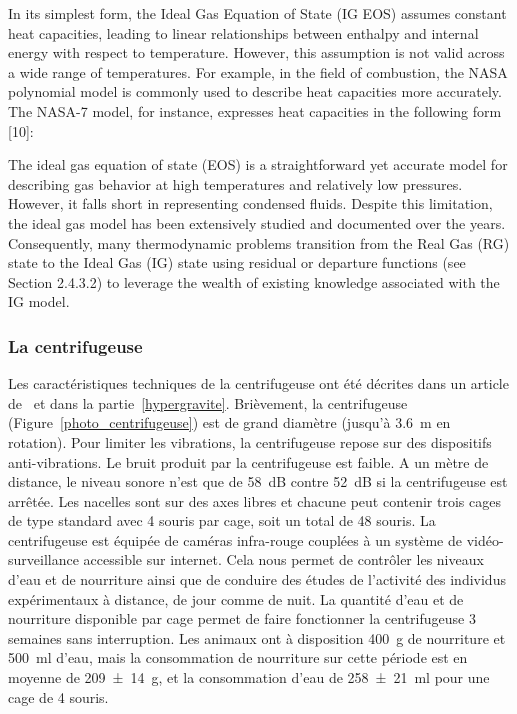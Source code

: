 	In its simplest form, the Ideal Gas Equation of State (IG EOS) assumes constant heat capacities, leading to linear relationships between enthalpy and internal energy 
	with respect to temperature. However, this assumption is not valid across a wide range of temperatures. For example, in the field of combustion, the NASA polynomial 
	model is commonly used to describe heat capacities more accurately. The NASA-7 model, for instance, expresses heat capacities in the following form [10]:


	The ideal gas equation of state (EOS) is a straightforward yet accurate model for describing gas behavior at high temperatures and relatively low pressures. 
	However, it falls short in representing condensed fluids. Despite this limitation, the ideal gas model has been extensively studied and documented over the years. 
	Consequently, many thermodynamic problems transition from the Real Gas (RG) state to the Ideal Gas (IG) state using residual or departure functions (see Section 2.4.3.2)
	to leverage the wealth of existing knowledge associated with the IG model.
	
		\subsubsection{La centrifugeuse}

			Les caractéristiques techniques de la centrifugeuse ont été décrites dans un article de~\cite{jamon_ground-based_2008} et dans la partie~\ref{hypergravite}. Brièvement, la centrifugeuse (Figure~\ref{photo_centrifugeuse}) est de grand diamètre (jusqu'à \SI{3.6}{\m} en rotation). Pour limiter les vibrations, la centrifugeuse repose sur des dispositifs anti-vibrations. Le bruit produit par la centrifugeuse est faible. A un mètre de distance, le niveau sonore n'est que de \SI{58}{\dB} contre \SI{52}{\dB} si la centrifugeuse est arrêtée. Les nacelles sont sur des axes libres et chacune peut contenir trois cages de type standard  avec 4 souris par cage, soit un total de 48 souris. La centrifugeuse est équipée de caméras infra-rouge couplées à un système de vidéo-surveillance accessible sur internet. Cela nous permet de contrôler les niveaux d'eau et de nourriture ainsi que de conduire des études de l'activité des individus expérimentaux à distance, de jour comme de nuit. La quantité d'eau et de nourriture disponible par cage permet de faire fonctionner la centrifugeuse 3 semaines sans interruption. Les animaux ont à disposition \SI{400}{\g} de nourriture et \SI{500}{\ml} d'eau, mais la consommation de nourriture sur cette période est en moyenne de \SI{209(14)}{\g}, et la consommation d'eau de \SI{258(21)}{\ml} pour une cage de 4 souris.

